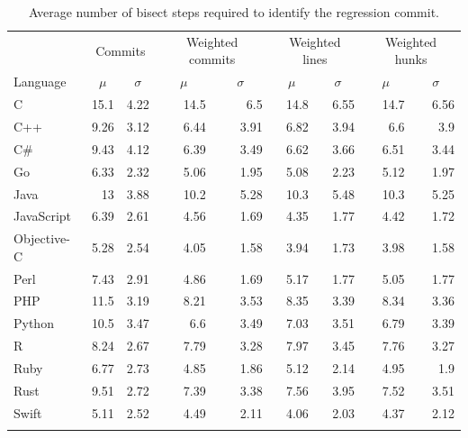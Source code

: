 \documentclass[pdflatex, sn-mathphys, referee]{sn-jnl}%
\theoremstyle{thmstyleone}%
\theoremstyle{thmstyletwo}%
\theoremstyle{thmstylethree}%
\theoremstyle{thmstyleone}
\begin{document}
\begin{table}[t!]
\begin{center}
\begin{minipage}{\textwidth}
\begin{tabular*}{\textwidth}{l r r r r r r r r}
\toprule%
 & \multicolumn{2}{c}{Commits} & \multicolumn{2}{c}{Weighted commits} & \multicolumn{2}{c}{Weighted lines} & \multicolumn{2}{c}{Weighted hunks} \\
Language & \multicolumn{1}{c}{$\mu$} & \multicolumn{1}{c}{$\sigma$} & \multicolumn{1}{c}{$\mu$} & \multicolumn{1}{c}{$\sigma$} & \multicolumn{1}{c}{$\mu$} & \multicolumn{1}{c}{$\sigma$} & \multicolumn{1}{c}{$\mu$} & \multicolumn{1}{c}{$\sigma$} \\
\midrule
C & 15.1 & 4.22 & 14.5 & 6.5 & 14.8 & 6.55 & 14.7 & 6.56 \\
C++ & 9.26 & 3.12 & 6.44 & 3.91 & 6.82 & 3.94 & 6.6 & 3.9 \\
C\# & 9.43 & 4.12 & 6.39 & 3.49 & 6.62 & 3.66 & 6.51 & 3.44 \\
Go & 6.33 & 2.32 & 5.06 & 1.95 & 5.08 & 2.23 & 5.12 & 1.97 \\
Java & 13 & 3.88 & 10.2 & 5.28 & 10.3 & 5.48 & 10.3 & 5.25 \\
JavaScript & 6.39 & 2.61 & 4.56 & 1.69 & 4.35 & 1.77 & 4.42 & 1.72 \\
Objective-C & 5.28 & 2.54 & 4.05 & 1.58 & 3.94 & 1.73 & 3.98 & 1.58 \\
Perl & 7.43 & 2.91 & 4.86 & 1.69 & 5.17 & 1.77 & 5.05 & 1.77 \\
PHP & 11.5 & 3.19 & 8.21 & 3.53 & 8.35 & 3.39 & 8.34 & 3.36 \\
Python & 10.5 & 3.47 & 6.6 & 3.49 & 7.03 & 3.51 & 6.79 & 3.39 \\
R & 8.24 & 2.67 & 7.79 & 3.28 & 7.97 & 3.45 & 7.76 & 3.27 \\
Ruby & 6.77 & 2.73 & 4.85 & 1.86 & 5.12 & 2.14 & 4.95 & 1.9 \\
Rust & 9.51 & 2.72 & 7.39 & 3.38 & 7.56 & 3.95 & 7.52 & 3.51 \\
Swift & 5.11 & 2.52 & 4.49 & 2.11 & 4.06 & 2.03 & 4.37 & 2.12 \\
\botrule
\end{tabular*}
\caption{\label{table:bisectsteps}Average number of bisect steps required to identify the regression commit.}
\end{minipage}
\end{center}
\end{table}
\end{document}
